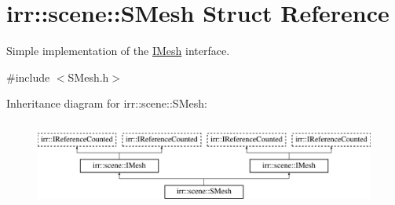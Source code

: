 \hypertarget{structirr_1_1scene_1_1SMesh}{}\section{irr\+:\+:scene\+:\+:S\+Mesh Struct Reference}
\label{structirr_1_1scene_1_1SMesh}


Simple implementation of the \hyperlink{classirr_1_1scene_1_1IMesh}{I\+Mesh} interface.  




{\ttfamily \#include $<$S\+Mesh.\+h$>$}

Inheritance diagram for irr\+:\+:scene\+:\+:S\+Mesh\+:\begin{figure}[H]
\begin{center}
\leavevmode
\includegraphics[height=2.837838cm]{structirr_1_1scene_1_1SMesh}
\end{center}
\end{figure}
